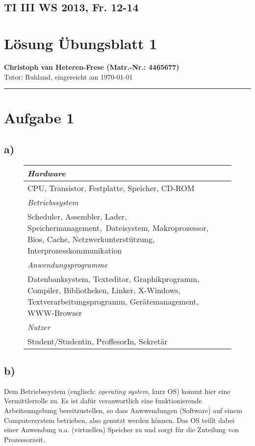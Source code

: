 \documentclass[11pt, a4paper]{scrartcl}
\begin{document}
\onecolumn
\subsection*{TI III WS 2013, Fr. 12-14}
\section*{Lösung Übungsblatt 1}
\textbf{Christoph van Heteren-Frese (Matr.-Nr.: 4465677)} \\ %
Tutor: Ruhland, eingereicht am \today\\
\hrule


\section*{Aufgabe 1}
\subsection*{a)}
\begin{figure}[H]
\center
\begin{tabular}{p{12cm}}
\toprule
\textit{Hardware} \\
\midrule 
CPU, Transistor, Festplatte, Spei\-cher, CD-ROM \\ 
\bottomrule \addlinespace
\textit{Betriebssystem} \\
\midrule
Scheduler, Assemb\-ler, Lader, Speichermanage\-ment,~Da\-tei\-sys\-tem, Makro\-pro\-zess\-or, Bios, Cache, Netz\-werk\-un\-ter\-stütz\-ung, Interprozesskommunikation\\
\bottomrule \addlinespace
\textit{Anwendungs\-pro\-gram\-me} \\
\midrule
Datenbanksystem, Texteditor, Graphikprogramm, Compil\-er, Bibliotheken, Linker, X-Windows, Text\-ver\-ar\-bei\-tungs\-pro\-gramm, Gerätemanagement, WWW-Browser\\
\bottomrule \addlinespace
\textit{Nutzer} \\
\midrule
Student/Studentin, ProffesorIn, Sekretär\\
\bottomrule
\end{tabular}
\end{figure}
\subsection*{b)}
Dem Betriebssystem (englisch: \textit{operating system}, kurz OS) kommt hier eine Vermittlerrolle zu. Es ist dafür veranwortlich eine funktionierende Arbeitsumgebung be\-reit\-zustellen, so dass Anwwendungen (Software) auf einem Computersystem \glqq betrieben\grqq, also genutzt werden können. Das OS teillt dabei einer Anwendung u.a. (virtuellen) Speicher zu und sorgt für die Zuteilung von Prozessorzeit.
\end{document}

